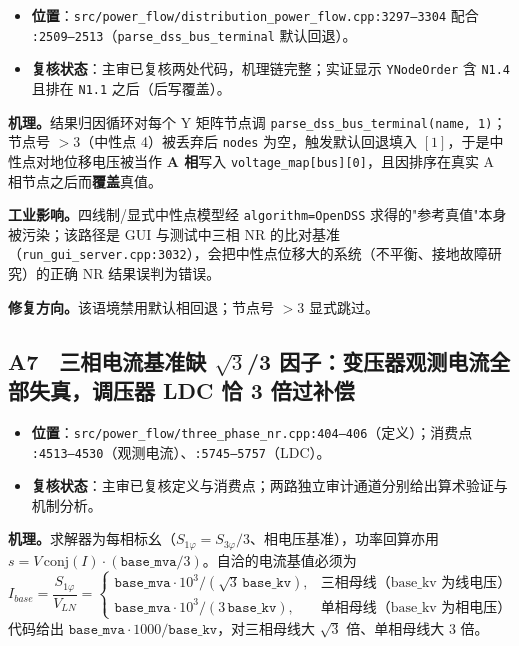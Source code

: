\documentclass[11pt,a4paper,fontset=fandol]{ctexart}
\newcommand{\file}[1]{\texttt{#1}}
\begin{document}
\begin{itemize}
  \item \textbf{位置}：\file{src/power\_flow/distribution\_power\_flow.cpp:3297--3304} 配合 \file{:2509--2513}（\file{parse\_dss\_bus\_terminal} 默认回退）。
  \item \textbf{复核状态}：主审已复核两处代码，机理链完整；实证显示 \file{YNodeOrder} 含 \file{N1.4} 且排在 \file{N1.1} 之后（后写覆盖）。
\end{itemize}

\textbf{机理。}结果归因循环对每个 Y 矩阵节点调 \file{parse\_dss\_bus\_terminal(name, 1)}；节点号 $>3$（中性点 4）被丢弃后 \file{nodes} 为空，触发默认回退填入 $[1]$，于是中性点对地位移电压被当作 \textbf{A 相}写入 \file{voltage\_map[bus][0]}，且因排序在真实 A 相节点之后而\textbf{覆盖}真值。

\textbf{工业影响。}四线制/显式中性点模型经 \file{algorithm=OpenDSS} 求得的"参考真值"本身被污染；该路径是 GUI 与测试中三相 NR 的比对基准（\file{run\_gui\_server.cpp:3032}），会把中性点位移大的系统（不平衡、接地故障研究）的正确 NR 结果误判为错误。

\textbf{修复方向。}该语境禁用默认相回退；节点号 $>3$ 显式跳过。

\subsection{A7　三相电流基准缺 $\sqrt{3}$/3 因子：变压器观测电流全部失真，调压器 LDC 恰 3 倍过补偿}
\label{sec:a7}

\begin{itemize}
  \item \textbf{位置}：\file{src/power\_flow/three\_phase\_nr.cpp:404--406}（定义）；消费点 \file{:4513--4530}（观测电流）、\file{:5745--5757}（LDC）。
  \item \textbf{复核状态}：主审已复核定义与消费点；两路独立审计通道分别给出算术验证与机制分析。
\end{itemize}

\textbf{机理。}求解器为每相标幺（$S_{1\varphi}=S_{3\varphi}/3$、相电压基准），功率回算亦用 $s=V\,\mathrm{conj}(I)\cdot(\texttt{base\_mva}/3)$。自洽的电流基值必须为
\begin{equation}
I_{base}=\frac{S_{1\varphi}}{V_{LN}}=
\begin{cases}
\texttt{base\_mva}\cdot 10^3/(\sqrt{3}\,\texttt{base\_kv}), & \text{三相母线（base\_kv 为线电压）}\\[2pt]
\texttt{base\_mva}\cdot 10^3/(3\,\texttt{base\_kv}), & \text{单相母线（base\_kv 为相电压）}
\end{cases}
\end{equation}
代码给出 $\texttt{base\_mva}\cdot 1000/\texttt{base\_kv}$，对三相母线大 $\sqrt{3}$ 倍、单相母线大 3 倍。
\end{document}
